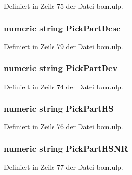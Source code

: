 Definiert in Zeile 75 der Datei bom.\+ulp.

\hypertarget{bom_8ulp_ae0948a58f18dc3accd52842b985053e5}{}
\subsubsection[{Pick\+Part\+Desc}]{\setlength{\rightskip}{0pt plus 5cm}numeric string Pick\+Part\+Desc}\label{bom_8ulp_ae0948a58f18dc3accd52842b985053e5}


Definiert in Zeile 79 der Datei bom.\+ulp.

\hypertarget{bom_8ulp_a1406270bbecf8f3f17c4ceb7ffaff638}{}
\subsubsection[{Pick\+Part\+Dev}]{\setlength{\rightskip}{0pt plus 5cm}numeric string Pick\+Part\+Dev}\label{bom_8ulp_a1406270bbecf8f3f17c4ceb7ffaff638}


Definiert in Zeile 74 der Datei bom.\+ulp.

\hypertarget{bom_8ulp_ac44e6ceaf40fadf3bd1fad3a25f3bba8}{}
\subsubsection[{Pick\+Part\+H\+S}]{\setlength{\rightskip}{0pt plus 5cm}numeric string Pick\+Part\+H\+S}\label{bom_8ulp_ac44e6ceaf40fadf3bd1fad3a25f3bba8}


Definiert in Zeile 76 der Datei bom.\+ulp.

\hypertarget{bom_8ulp_acbcdc33dac2b006e723ac2ca032ad8f1}{}
\subsubsection[{Pick\+Part\+H\+S\+N\+R}]{\setlength{\rightskip}{0pt plus 5cm}numeric string Pick\+Part\+H\+S\+N\+R}\label{bom_8ulp_acbcdc33dac2b006e723ac2ca032ad8f1}


Definiert in Zeile 77 der Datei bom.\+ulp.

